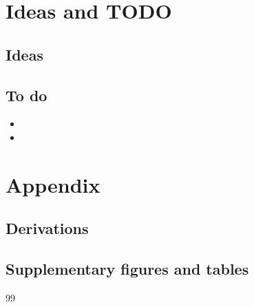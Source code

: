 \documentclass[11pt,a4paper]{article}
\newcommand{\idea}[1]{\par\noindent{\color{green!40!black}\textbf{[Idea]} #1}\par}
\begin{document}
\section{Ideas and TODO}
\subsection{Ideas}
\idea{}

\subsection{To do}
\begin{itemize}
  \item[$\square$]
  \item[$\square$]
\end{itemize}

\appendix
\section{Appendix}
\subsection{Derivations}

\subsection{Supplementary figures and tables}

\begin{thebibliography}{99}
\end{thebibliography}
% 
% 
\end{document}

